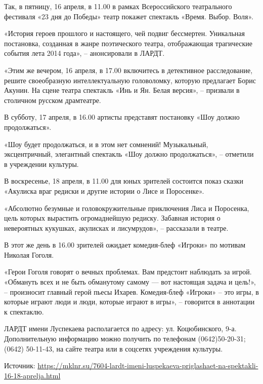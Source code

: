 Так, в пятницу, 16 апреля, в 11.00 в рамках Всероссийского театрального
фестиваля «23 дня до Победы» театр покажет спектакль «Время. Выбор. Воля».

«История героев прошлого и настоящего, чей подвиг бессмертен. Уникальная
постановка, созданная в жанре поэтического театра, отображающая трагические
события лета 2014 года», – анонсировали в ЛАРДТ.

«Этим же вечером, 16 апреля, в 17.00 включитесь в детективное расследование,
решите своеобразную интеллектуальную головоломку, которую предлагает Борис
Акунин. На сцене театра спектакль «Инь и Ян. Белая версия», – призвали в
столичном русском драмтеатре.

В субботу, 17 апреля, в 16.00 артисты представят постановку «Шоу должно продолжаться».

«Шоу будет продолжаться, и в этом нет сомнений! Музыкальный, эксцентричный,
элегантный спектакль «Шоу должно продолжаться», – отметили в учреждении
культуры.

В воскресенье, 18 апреля, в 11.00 для юных зрителей состоится показ сказки «Акулиска враг редиски и другие истории о Лисе и Поросенке».

«Абсолютно безумные и головокружительные приключения Лиса и Поросенка, цель
которых вырастить огромаднейшую редиску. Забавная история о невероятных
кукушках, акулисках и лисумрудов», – рассказали в театре.

В этот же день в 16.00 зрителей ожидает комедия-блеф «Игроки» по мотивам
Николая Гоголя.

«Герои Гоголя говорят о вечных проблемах. Вам предстоит наблюдать за игрой.
«Обмануть всех и не быть обманутому самому — вот настоящая задача и цель!», –
произносит главный герой пьесы Ихарев.  Комедия-блеф «Игроки» – это игры, в
которые играют люди и люди, которые играют в игры», – говорится в аннотации к
спектаклю.

ЛАРДТ имени Луспекаева располагается по адресу: ул. Коцюбинского, 9-а.
Дополнительную информацию можно получить по телефонам (0642)50-20-31; (0642)
50-11-43, на сайте театра или в соцсетях учреждения культуры.

Источник: 
\url{https://mklnr.su/7604-lardt-imeni-luspekaeva-priglashaet-na-spektakli-16-18-aprelja.html}
